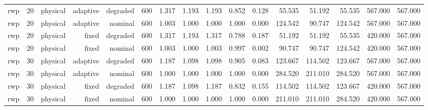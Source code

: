 \begin{tabular}{lrrrrrrrrrrrrrrr}
rwp & 20 & physical & adaptive & degraded & 600 & 1.317 & 1.193 & 1.193 & 0.852 & 0.128 & 55.535 & 51.192 & 55.535 & 567.000 & 567.000 \\
rwp & 20 & physical & adaptive & nominal & 600 & 1.003 & 1.000 & 1.000 & 1.000 & 0.000 & 124.542 & 90.747 & 124.542 & 567.000 & 567.000 \\
rwp & 20 & physical & fixed & degraded & 600 & 1.317 & 1.193 & 1.317 & 0.788 & 0.187 & 51.192 & 51.192 & 55.535 & 420.000 & 567.000 \\
rwp & 20 & physical & fixed & nominal & 600 & 1.003 & 1.000 & 1.003 & 0.997 & 0.002 & 90.747 & 90.747 & 124.542 & 420.000 & 567.000 \\
rwp & 30 & physical & adaptive & degraded & 600 & 1.187 & 1.098 & 1.098 & 0.905 & 0.083 & 123.667 & 114.502 & 123.667 & 567.000 & 567.000 \\
rwp & 30 & physical & adaptive & nominal & 600 & 1.000 & 1.000 & 1.000 & 1.000 & 0.000 & 284.520 & 211.010 & 284.520 & 567.000 & 567.000 \\
rwp & 30 & physical & fixed & degraded & 600 & 1.187 & 1.098 & 1.187 & 0.832 & 0.155 & 114.502 & 114.502 & 123.667 & 420.000 & 567.000 \\
rwp & 30 & physical & fixed & nominal & 600 & 1.000 & 1.000 & 1.000 & 1.000 & 0.000 & 211.010 & 211.010 & 284.520 & 420.000 & 567.000 \\
\bottomrule
\end{tabular}
